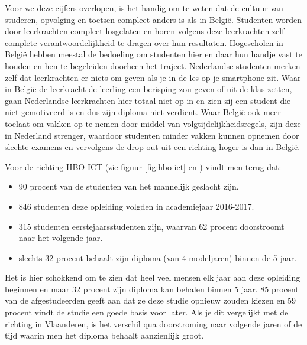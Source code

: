 Voor we deze cijfers overlopen, is het handig om te weten dat de cultuur van studeren, opvolging en toetsen compleet anders is als in België. Studenten worden door leerkrachten compleet losgelaten en horen volgens deze leerkrachten zelf complete verantwoordelijkheid te dragen over hun resultaten. Hogescholen in België hebben meestal de bedoeling om studenten hier en daar hun handje vast te houden en hen te begeleiden doorheen het traject. Nederlandse studenten merken zelf dat leerkrachten er niets om geven als je in de les op je smartphone zit. Waar in België de leerkracht de leerling een berisping zou geven of uit de klas zetten, gaan Nederlandse leerkrachten hier totaal niet op in en zien zij een student die niet gemotiveerd is en dus zijn diploma niet verdient. Waar België ook meer toelaat om vakken op te nemen door middel van volgtijdelijkheidsregels, zijn deze in Nederland strenger, waardoor studenten minder vakken kunnen opnemen door slechte examens en vervolgens de drop-out uit een richting hoger is dan in België.

Voor de richting HBO-ICT (zie figuur \ref{fig:hbo-ict} en \textcite{Studiekeuze2017}) vindt men terug dat:
\begin{itemize}
	\item 90 procent van de studenten van het mannelijk geslacht zijn.
	\item 846 studenten deze opleiding volgden in academiejaar 2016-2017.
	\item 315 studenten eerstejaarsstudenten zijn, waarvan 62 procent doorstroomt naar het volgende jaar.
	\item slechts 32 procent behaalt zijn diploma (van 4 modeljaren) binnen de 5 jaar.
\end{itemize}

Het is hier schokkend om te zien dat heel veel mensen elk jaar aan deze opleiding beginnen en maar 32 procent zijn diploma kan behalen binnen 5 jaar. 85 procent van de afgestudeerden geeft aan dat ze deze studie opnieuw zouden kiezen en 59 procent vindt de studie een goede basis voor later. Als je dit vergelijkt met de richting in Vlaanderen, is het verschil qua doorstroming naar volgende jaren of de tijd waarin men het diploma behaalt aanzienlijk groot.

